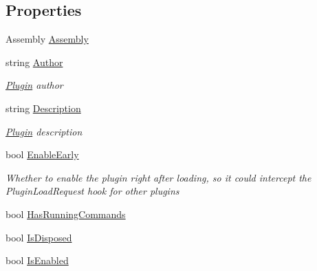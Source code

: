 \subsection*{Properties}
\begin{DoxyCompactItemize}
\item 
Assembly \hyperlink{classOTA_1_1Plugin_1_1BasePlugin_aeee0920fba5ccfdf0f5e9d349143f4c1}{Assembly}
\item 
string \hyperlink{classOTA_1_1Plugin_1_1BasePlugin_a13cf46aff4dea87a8f5285a09efece69}{Author}
\begin{DoxyCompactList}\small\item\em \hyperlink{namespaceOTA_1_1Plugin}{Plugin} author \end{DoxyCompactList}\item 
string \hyperlink{classOTA_1_1Plugin_1_1BasePlugin_a34409fed9d39281ada2d7ec172a52f9b}{Description}
\begin{DoxyCompactList}\small\item\em \hyperlink{namespaceOTA_1_1Plugin}{Plugin} description \end{DoxyCompactList}\item 
bool \hyperlink{classOTA_1_1Plugin_1_1BasePlugin_aaa3aa1c9f18769d26ca456053b1134a8}{Enable\+Early}
\begin{DoxyCompactList}\small\item\em Whether to enable the plugin right after loading, so it could intercept the Plugin\+Load\+Request hook for other plugins \end{DoxyCompactList}\item 
bool \hyperlink{classOTA_1_1Plugin_1_1BasePlugin_aeba0d1037b23829a0e92ff7846cc745f}{Has\+Running\+Commands}
\item 
bool \hyperlink{classOTA_1_1Plugin_1_1BasePlugin_ab96a71c70205ed1aa4af692ee7f35403}{Is\+Disposed}
\item 
bool \hyperlink{classOTA_1_1Plugin_1_1BasePlugin_a45f8df3acbb2721c2df8462f1cd8f14b}{Is\+Enabled}

\end{DoxyCompactItemize}
